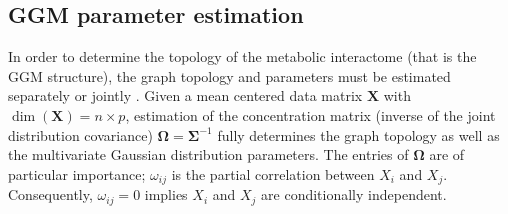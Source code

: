 \documentclass[11pt]{article}
\begin{document}
\subsection{GGM parameter estimation}
In order to determine the topology of the metabolic interactome (that is the GGM structure), the graph topology and parameters must be estimated separately \citep{meinshausen2006} or jointly \citep{friedman2007,yuan2007,banerjee2008}. Given a mean centered data matrix $\textbf{X}$ with $\dim(\textbf{X})=n\times p$, estimation of the concentration matrix (inverse of the joint distribution covariance) $\boldsymbol{\Omega}=\boldsymbol{\Sigma}^{-1}$ fully determines the graph topology as well as the multivariate Gaussian distribution parameters. The entries of $\boldsymbol{\Omega}$ are of particular importance; $\omega_{ij}$ is the partial correlation between $X_i$ and $X_j$. Consequently, $\omega_{ij}=0$ implies $X_i$ and $X_j$ are conditionally independent.
\end{document}
